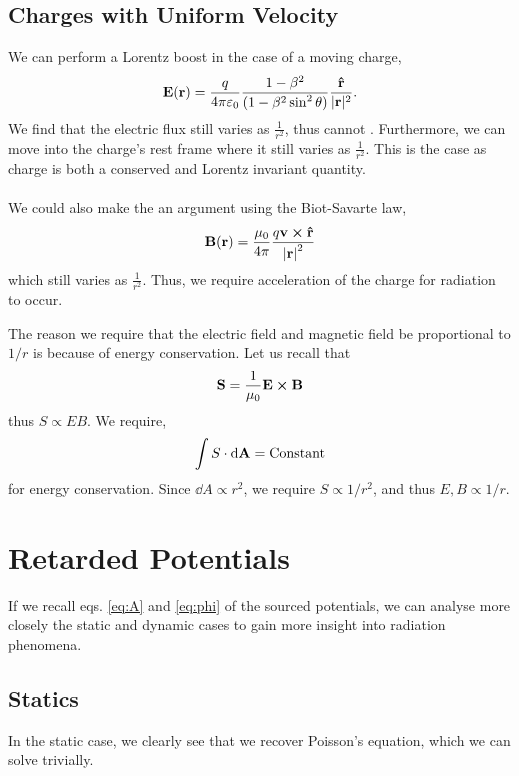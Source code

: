 \documentclass{book}
\newenvironment{aside}
{\begin{mdframed}[style=0,%
		leftline=false,rightline=false,leftmargin=2em,rightmargin=2em,%
		innerleftmargin=0pt,innerrightmargin=0pt,linewidth=0.75pt,%
		skipabove=7pt,skipbelow=7pt]\small}
	{\end{mdframed}}
\begin{document}
\subsection{Charges with Uniform Velocity}
We can perform a Lorentz boost in the case of a moving charge,
\begin{equation}
	\vb{E}(\vb{r}) = \frac{q}{4\pi \varepsilon_0}\frac{1-\beta^2}{(1 - \beta^2\sin^2\theta)}\frac{\vu{r}}{|\vb{r}|^2}.
\end{equation}
We find that the electric flux still varies as $\frac{1}{r^2}$, thus cannot . Furthermore, we can move into the charge's rest frame where it still varies as $\frac{1}{r^2}$. This is the case as charge is both a conserved and Lorentz invariant quantity.
\\\\
We could also make the an argument using the Biot-Savarte law,
\begin{equation}
	\vb{B}(\vb{r}) = \frac{\mu_0}{4\pi}\frac{q\vb{v}\cross\vu{r}}{\left|\vb{r}\right|^2}
\end{equation}
which still varies as $\frac{1}{r^2}$. Thus, we require acceleration of the charge for radiation to occur.
\begin{aside}
	The reason we require that the electric field and magnetic field be proportional to $1/r$ is because of energy conservation. Let us recall that
	\begin{equation}
		\vb{S} = \frac{1}{\mu_0}\vb{E}\cross\vb{B}
	\end{equation}
	thus $S \propto EB$. We require,
	\begin{equation}
		\int S\cdot\dd{\vb{A}} = \text{Constant}
	\end{equation}
	for energy conservation. Since $\dd{A} \propto r^2$, we require $S \propto 1/r^2$, and thus $E,B \propto 1/r$.
\end{aside}
\section{Retarded Potentials}
If we recall eqs. \eqref{eq:A} and \eqref{eq:phi} of the sourced potentials, we can analyse more closely the static and dynamic cases to gain more insight into radiation phenomena.
\subsection{Statics}
In the static case, we clearly see that we recover Poisson's equation, which we can solve trivially.
\end{document}
